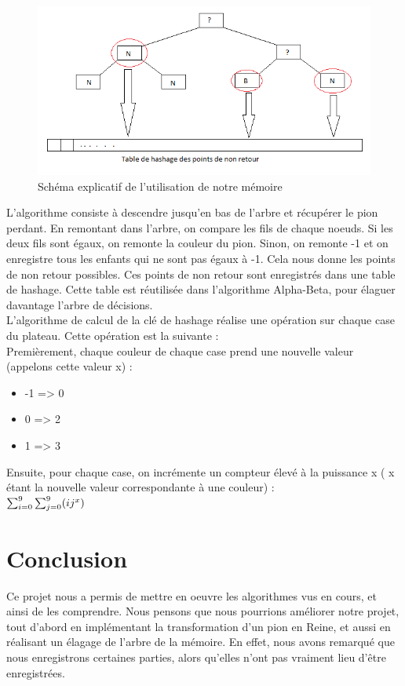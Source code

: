 \documentclass[a4paper, title page, 12pt]{report}
\begin{document}
\begin{figure}[h]
\begin{center}
\includegraphics[scale=0.5]{img/arbre_hashage_memoire.png}
\end{center}
\caption{Schéma explicatif de l'utilisation de notre mémoire}
\end{figure}	

L'algorithme consiste à descendre jusqu'en bas de l'arbre et récupérer le pion perdant. En remontant dans l'arbre, on compare les fils de chaque noeuds. Si les deux fils sont égaux, on remonte la couleur du pion. Sinon, on remonte -1 et on enregistre tous les enfants qui ne sont pas égaux à -1. Cela nous donne les points de non retour possibles. Ces points de non retour sont enregistrés dans une table de hashage. Cette table est réutilisée dans l'algorithme Alpha-Beta, pour élaguer davantage l'arbre de décisions.\\


L'algorithme de calcul de la clé de hashage réalise une opération sur chaque case du plateau. Cette opération est la suivante :\\

Premièrement, chaque couleur de chaque case prend une nouvelle valeur (appelons cette valeur x) :\\
\begin{itemize}
\item -1 => 0
\item 0 => 2
\item 1 => 3
\end{itemize}
\newpage
Ensuite, pour chaque case, on incrémente un compteur élevé à la puissance x ( x étant la nouvelle valeur correspondante à une couleur) :\\

	\begin{math}
	\sum_{i=0}^{9}\sum_{j=0}^{9} (ij^{x})\\
	\end{math}
	
	\section*{Conclusion}
	Ce projet nous a permis de mettre en oeuvre les algorithmes vus en cours, et ainsi de les comprendre. Nous pensons que nous pourrions améliorer notre projet, tout d'abord en implémentant la transformation d'un pion en Reine, et aussi en réalisant un élagage de l'arbre de la mémoire. En effet, nous avons remarqué que nous enregistrons certaines parties, alors qu'elles n'ont pas vraiment lieu d'être enregistrées.
\end{document}
